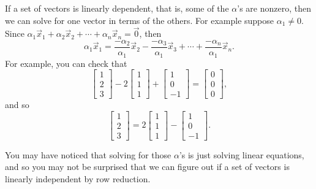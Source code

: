 If a set of vectors is linearly dependent, that is, some of the $\alpha$'s
are nonzero, then we can solve for one vector in terms of the others.
For example suppose $\alpha_1 \not= 0$.  Since
$\alpha_1 \vec{x}_1 + 
\alpha_2 \vec{x}_2 + 
\cdots +
\alpha_n \vec{x}_n 
=
\vec{0}$, then
\begin{equation*}
\alpha_1 \vec{x}_1 
=
\frac{-\alpha_2}{\alpha_1}
\vec{x}_2 - 
\frac{-\alpha_3}{\alpha_1}
\vec{x}_3 + 
\cdots +
\frac{-\alpha_n}{\alpha_1}
\vec{x}_n .
\end{equation*}
For example, you can check that
\begin{equation*}
\begin{bmatrix} 1 \\ 2 \\ 3 \end{bmatrix}
-2
\begin{bmatrix} 1 \\ 1 \\ 1 \end{bmatrix}
+
\begin{bmatrix} 1 \\ 0 \\ -1 \end{bmatrix}
=
\begin{bmatrix} 0 \\ 0 \\ 0 \end{bmatrix} ,
\end{equation*}
and so
\begin{equation*}
\begin{bmatrix} 1 \\ 2 \\ 3 \end{bmatrix}
=
2
\begin{bmatrix} 1 \\ 1 \\ 1 \end{bmatrix}
-
\begin{bmatrix} 1 \\ 0 \\ -1 \end{bmatrix} .
\end{equation*}

You may have noticed that solving for those $\alpha$'s is just solving
linear equations, and so you may not be surprised that we can figure out
if a set of vectors is linearly independent by row reduction.

